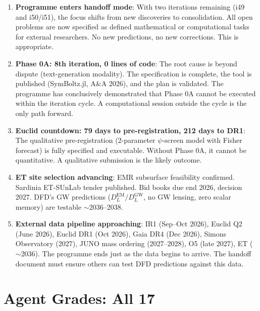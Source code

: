 \documentclass[11pt,a4paper]{article}
\begin{document}
\begin{enumerate}
\item \textbf{Programme enters handoff mode}: With two iterations remaining (i49 and i50/i51), the focus shifts from new discoveries to consolidation. All open problems are now specified as defined mathematical or computational tasks for external researchers. No new predictions, no new corrections. This is appropriate.

\item \textbf{Phase 0A: 8th iteration, 0 lines of code}: The root cause is beyond dispute (text-generation modality). The specification is complete, the tool is published (SymBoltz.jl, A\&A 2026), and the plan is validated. The programme has conclusively demonstrated that Phase 0A cannot be executed within the iteration cycle. A computational session outside the cycle is the only path forward.

\item \textbf{Euclid countdown: 79 days to pre-registration, 212 days to DR1}: The qualitative pre-registration (2-parameter $\psi$-screen model with Fisher forecast) is fully specified and executable. Without Phase 0A, it cannot be quantitative. A qualitative submission is the likely outcome.

\item \textbf{ET site selection advancing}: EMR subsurface feasibility confirmed. Sardinia ET-SUnLab tender published. Bid books due end 2026, decision 2027. DFD's GW predictions ($D_L^{\text{EM}}/D_L^{\text{GW}}$, no GW lensing, zero scalar memory) are testable $\sim$2036--2038.

\item \textbf{External data pipeline approaching}: IR1 (Sep--Oct 2026), Euclid Q2 (June 2026), Euclid DR1 (Oct 2026), Gaia DR4 (Dec 2026), Simons Observatory (2027), JUNO mass ordering (2027--2028), O5 (late 2027), ET ($\sim$2036). The programme ends just as the data begins to arrive. The handoff document must ensure others can test DFD predictions against this data.
\end{enumerate}


\part{Agent Grades: All 17}
\end{document}
